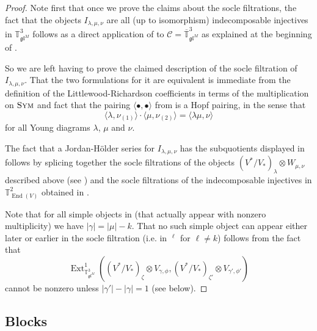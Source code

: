 \documentclass[11pt]{article}
\theoremstyle{plain}
\theoremstyle{nonumberplain}
\theoremstyle{plain}
\theoremstyle{nonumberplain}
\newtheorem{proof}{Proof}
\newcommand\bT{{\mathbb T}}
\newcommand\cC{{\mathcal C}}
\newcommand\fgl{\mathfrak{gl}}
\newcommand\ol{\overline}
\DeclareMathOperator{\End}{\mathrm{End}}
\DeclareMathOperator{\Ext}{\mathrm{Ext}}
\DeclareMathOperator{\usoc}{\underline{\mathrm{soc}}}
\DeclareMathOperator{\sym}{\cat{Sym}}
\newcommand{\cat}[1]{\textsc{#1}}
\begin{document}
\begin{proof}
Note first that once we prove the claims about the socle filtrations, the fact that the objects $I_{\lambda,\mu,\nu}$ are all (up to isomorphism) indecomposable injectives in $\bT^3_{\fgl^M}$ follows as a direct application of  to $\cC=\ol{\bT}^3_{\fgl^M}$ as explained at the beginning of . 

So we are left having to prove the claimed description of the socle filtration of $I_{\lambda,\mu,\nu}$. That the two formulations for it are equivalent is immediate from the definition of the Littlewood-Richardson coefficients in terms of the multiplication on $\sym$ and fact that the pairing $\langle\bullet,\bullet\rangle$ from  is a Hopf pairing, in the sense that 
  \begin{equation*}
    \langle \lambda,\nu_{(1)}\rangle\cdot\langle \mu,\nu_{(2)}\rangle = \langle \lambda\mu,\nu\rangle
  \end{equation*}
for all Young diagrams $\lambda$, $\mu$ and $\nu$. 

The fact that a Jordan-H\"older series for $I_{\lambda,\mu,\nu}$ has the subquotients displayed in  follows by splicing together the socle filtrations of the objects $(V^*/V_*)_\lambda\otimes W_{\mu,\nu}$ described above (see ) and the socle filtrations of the indecomposable injectives in $\bT^2_{\End(V)}$ obtained in \cite[Theorem 2.3]{PS}.

Note that for all simple objects in  (that actually appear
with nonzero multiplicity) we have $|\gamma|=|\mu|-k$. That no such
simple object can appear either later or earlier in the socle
filtration (i.e. in $\usoc^\ell$ for $\ell\ne k$) follows from the fact that
\begin{equation*}
  \Ext_{\mathbb{T}^3_{\mathfrak{gl}^M}}^1((V^*/V_*)_{\zeta}\otimes V_{\gamma,\phi},(V^*/V_*)_{\zeta'}\otimes V_{\gamma',\phi'})
\end{equation*}
cannot be nonzero unless $|\gamma'|-|\gamma|=1$ (see  below). 
\end{proof}











\subsection{Blocks}\label{subse.3d_blocks}
\end{document}

